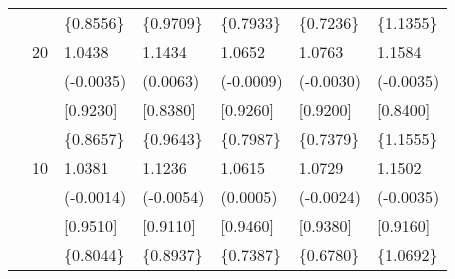 \begin{table}[ht]
\begin{tabular}{lllllll}
&&\{0.8556\}&\{0.9709\}&\{0.7933\}&\{0.7236\}&\{1.1355\}\\
&20&1.0438&1.1434&1.0652&1.0763&1.1584\\
&&(-0.0035)&(0.0063)&(-0.0009)&(-0.0030)&(-0.0035)\\
&&[0.9230]&[0.8380]&[0.9260]&[0.9200]&[0.8400]\\
&&\{0.8657\}&\{0.9643\}&\{0.7987\}&\{0.7379\}&\{1.1555\}\\
&10&1.0381&1.1236&1.0615&1.0729&1.1502\\
&&(-0.0014)&(-0.0054)&(0.0005)&(-0.0024)&(-0.0035)\\
&&[0.9510]&[0.9110]&[0.9460]&[0.9380]&[0.9160]\\
&&\{0.8044\}&\{0.8937\}&\{0.7387\}&\{0.6780\}&\{1.0692\}\\
\hline
\end{tabular}
\end{table}


